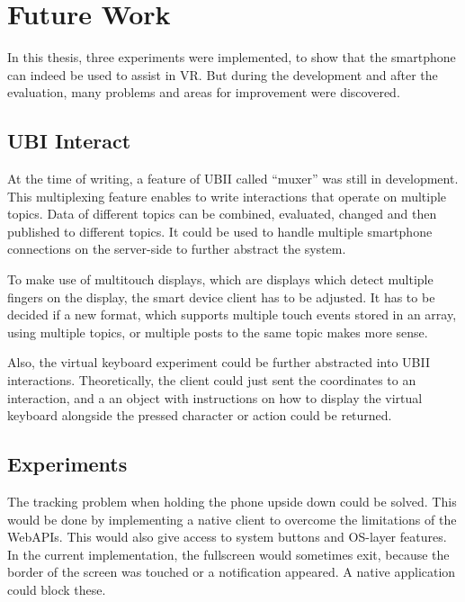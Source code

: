 \chapter{Future Work}\label{chapter:future-work}

In this thesis, three experiments were implemented, to show that the smartphone can indeed be used to assist in \ac{VR}. But during the development and after the evaluation, many problems and areas for improvement were discovered. 



\section{UBI Interact}\label{section:fw-ubii}

At the time of writing, a feature of \ac{UBII} called \enquote{muxer} was still in development. This multiplexing feature enables to write interactions that operate on multiple topics. Data of different topics can be combined, evaluated, changed and then published to different topics. It could be used to handle multiple smartphone connections on the server-side to further abstract the system.

To make use of multitouch displays, which are displays which detect multiple fingers on the display, the smart device client has to be adjusted. It has to be decided if a new format, which supports multiple touch events stored in an array, using multiple topics, or multiple posts to the same topic makes more sense.

Also, the virtual keyboard experiment could be further abstracted into \ac{UBII} interactions. Theoretically, the client could just sent the coordinates to an interaction, and a an object with instructions on how to display the virtual keyboard alongside the pressed character or action could be returned.



\section{Experiments}\label{section:fw-experiments}

The tracking problem when holding the phone upside down could be solved. This would be done by implementing a native client to overcome the limitations of the WebAPIs. This would also give access to system buttons and \ac{OS}-layer features. In the current implementation, the fullscreen would sometimes exit, because the border of the screen was touched or a notification appeared. A native application could block these.

